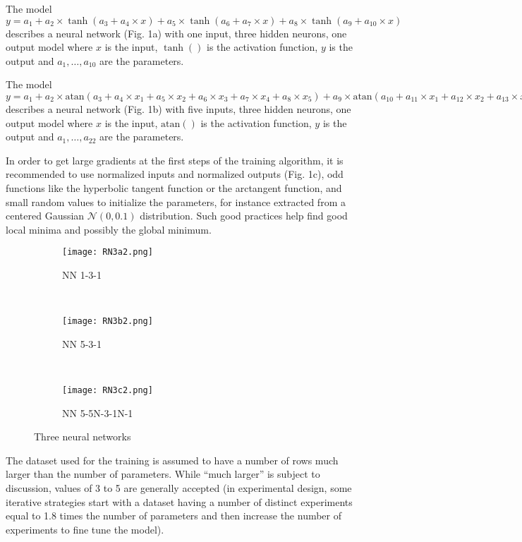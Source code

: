 The model
\(y = a_1 + a_2\times \tanh(a_3 + a_4\times x) + a_5\times \tanh(a_6 + a_7\times x) + a_8\times \tanh(a_9 + a_{10}\times x)\)
describes a neural network (Fig. 1a) with one input, three hidden
neurons, one output model where \(x\) is the input, \(\tanh()\) is the
activation function, \(y\) is the output and \(a_1,\dots,a_{10}\) are
the parameters.

The model
\(y = a_1 + a_2\times \text{atan}(a_3 + a_4\times x_1 + a_5\times x_2 + a_6\times x_3 + a_7\times x_4 + a_8\times x_5) + a_9\times \text{atan}(a_{10} + a_{11}\times x_1 + a_{12}\times x_2 + a_{13}\times x_3 + a_{14}\times x_4 + a_{15}\times x_5) + a_{16}\text{atan}(a_{17} + a_{18}\times x_1 + a_{19}\times x_2 + a_{20}\times x_3 + a_{21}\times x_4 + a_{22}\times x_5)\)
describes a neural network (Fig. 1b) with five inputs, three hidden
neurons, one output model where \(x\) is the input, \(\text{atan}()\) is
the activation function, \(y\) is the output and \(a_1,\dots,a_{22}\)
are the parameters.

In order to get large gradients at the first steps of the training
algorithm, it is recommended to use normalized inputs and normalized
outputs (Fig. 1c), odd functions like the hyperbolic tangent function or
the arctangent function, and small random values to initialize the
parameters, for instance extracted from a centered Gaussian
\(\mathcal N(0, 0.1)\) distribution. Such good practices help find good
local minima and possibly the global minimum.

\begin{figure}
    \centering
    \begin{subfigure}[b]{0.242\textwidth}
        \texttt{[image: RN3a2.png]}
        \caption{NN 1-3-1}
        \label{fig:N131}
    \end{subfigure}
    ~ 
    \begin{subfigure}[b]{0.250\textwidth}
        \texttt{[image: RN3b2.png]}
        \caption{NN 5-3-1}
        \label{fig:N531}
    \end{subfigure}
    ~ 
    \begin{subfigure}[b]{0.396\textwidth}
        \texttt{[image: RN3c2.png]}
        \caption{NN 5-5N-3-1N-1}
        \label{fig:N55311}
    \end{subfigure}
    \caption{Three neural networks}
\end{figure}

The dataset used for the training is assumed to have a number of rows
much larger than the number of parameters. While ``much larger'' is
subject to discussion, values of 3 to 5 are generally accepted (in
experimental design, some iterative strategies start with a dataset
having a number of distinct experiments equal to 1.8 times the number of
parameters and then increase the number of experiments to fine tune the
model).

